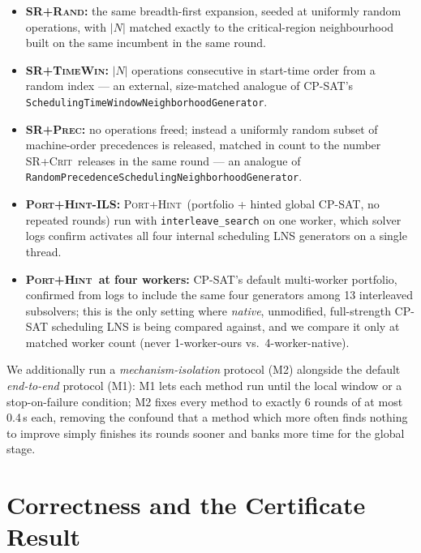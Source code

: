 \documentclass[letterpaper]{article} %
\newcommand{\crit}{\textsc{SR+Crit}}
\newcommand{\rnd}{\textsc{SR+Rand}}
\newcommand{\tw}{\textsc{SR+TimeWin}}
\newcommand{\precn}{\textsc{SR+Prec}}
\newcommand{\ph}{\textsc{Port+Hint}}
\newcommand{\native}{\textsc{Port+Hint-ILS}}
\begin{document}
\begin{itemize}
\item \textbf{\rnd:} the same breadth-first expansion, seeded at uniformly random operations, with $|N|$ matched exactly to the critical-region neighbourhood built on the same incumbent in the same round.
\item \textbf{\tw:} $|N|$ operations consecutive in start-time order from a random index --- an external, size-matched analogue of CP-SAT's \texttt{SchedulingTime\-Window\-Neighborhood\-Generator}.
\item \textbf{\precn:} no operations freed; instead a uniformly random subset of machine-order precedences is released, matched in count to the number \crit\ releases in the same round --- an analogue of \texttt{Random\-Precedence\-Scheduling\-Neighborhood\-Generator}.
\item \textbf{\native:} \ph\ (portfolio + hinted global CP-SAT, no repeated rounds) run with \texttt{interleave\_search} on one worker, which solver logs confirm activates all four internal scheduling LNS generators on a single thread.
\item \textbf{\ph\ at four workers:} CP-SAT's default multi-worker portfolio, confirmed from logs to include the same four generators among 13 interleaved subsolvers; this is the only setting where \emph{native}, unmodified, full-strength CP-SAT scheduling LNS is being compared against, and we compare it only at matched worker count (never 1-worker-ours vs.\ 4-worker-native).
\end{itemize}
We additionally run a \emph{mechanism-isolation} protocol (M2) alongside the default \emph{end-to-end} protocol (M1): M1 lets each method run until the local window or a stop-on-failure condition; M2 fixes every method to exactly 6 rounds of at most 0.4\,s each, removing the confound that a method which more often finds nothing to improve simply finishes its rounds sooner and banks more time for the global stage.

\section{Correctness and the Certificate Result}
\label{sec:certificate}
\label{sec:verify}
\end{document}
